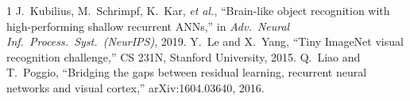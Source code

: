 \documentclass[conference]{IEEEtran}
\begin{document}
\begin{thebibliography}{1}
 J.~Kubilius, M.~Schrimpf, K.~Kar, \emph{et al.}, ``Brain-like object recognition with high-performing shallow recurrent ANNs,'' in \emph{Adv.\ Neural Inf.\ Process.\ Syst.\ (NeurIPS)}, 2019.
 Y.~Le and X.~Yang, ``Tiny ImageNet visual recognition challenge,'' CS 231N, Stanford University, 2015.
 Q.~Liao and T.~Poggio, ``Bridging the gaps between residual learning, recurrent neural networks and visual cortex,'' arXiv:1604.03640, 2016.
\end{thebibliography}
\end{document}
